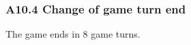 \documentclass{article}
\begin{document}
\begin{CJK}{UTF8}{min}
\subsubsection*{A10.4 Change of game turn end}

The game ends in 8 game turns.




























\end{CJK}
\end{document}
